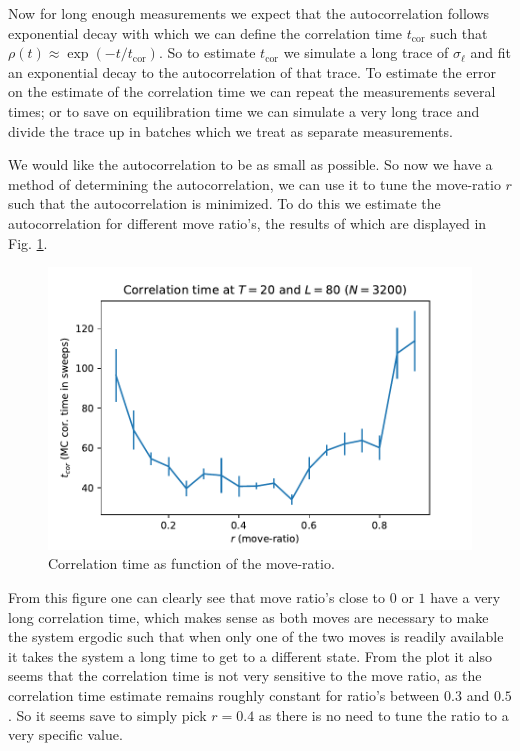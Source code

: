 Now for long enough measurements we expect that the autocorrelation follows exponential decay with which we can define the correlation time $t_\text{cor}$ such that $\rho(t) \approx \exp(- t / t_\text{cor})$.
So to estimate $t_\text{cor}$ we simulate a long trace of $\sigma_\ell$ and fit an exponential decay to the autocorrelation of that trace.
To estimate the error on the estimate of the correlation time we can repeat the measurements several times; or to save on equilibration time we can simulate a very long trace and divide the trace up in batches which we treat as separate measurements.

We would like the autocorrelation to be as small as possible.
So now we have a method of determining the autocorrelation, we can use it to tune the move-ratio $r$ such that the autocorrelation is minimized.
To do this we estimate the autocorrelation for different move ratio's, the results of which are displayed in Fig. \ref{fig:tcor_rdep}.
\begin{figure}[ht]
    \centering
    \includegraphics[width=0.7\linewidth]{img/tcor_r_t20_l80.pdf}
    \caption{Correlation time as function of the move-ratio.}
    \label{fig:tcor_rdep}
\end{figure}
From this figure one can clearly see that move ratio's close to $0$ or $1$ have a very long correlation time, which makes sense as both moves are necessary to make the system ergodic such that when only one of the two moves is readily available it takes the system a long time to get to a different state.
From the plot it also seems that the correlation time is not very sensitive to the move ratio, as the correlation time estimate remains roughly constant for ratio's between $0.3$ and $0.5$.
So it seems save to simply pick $r = 0.4$ as there is no need to tune the ratio to a very specific value.

